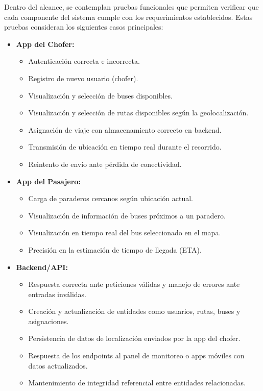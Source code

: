 \documentclass[12pt]{article}
\begin{document}
Dentro del alcance, se contemplan pruebas funcionales que permiten verificar que cada componente del sistema cumple con los requerimientos establecidos. Estas pruebas consideran los siguientes casos principales:

\begin{itemize}
    \item \textbf{App del Chofer:}
    \begin{itemize}
        \item Autenticación correcta e incorrecta.
        \item Registro de nuevo usuario (chofer).
        \item Visualización y selección de buses disponibles.
        \item Visualización y selección de rutas disponibles según la geolocalización.
        \item Asignación de viaje con almacenamiento correcto en backend.
        \item Transmisión de ubicación en tiempo real durante el recorrido.
        \item Reintento de envío ante pérdida de conectividad.
    \end{itemize}

    \item \textbf{App del Pasajero:}
    \begin{itemize}
        \item Carga de paraderos cercanos según ubicación actual.
        \item Visualización de información de buses próximos a un paradero.
        \item Visualización en tiempo real del bus seleccionado en el mapa.
        \item Precisión en la estimación de tiempo de llegada (ETA).
    \end{itemize}

    \item \textbf{Backend/API:}
    \begin{itemize}
        \item Respuesta correcta ante peticiones válidas y manejo de errores ante entradas inválidas.
        \item Creación y actualización de entidades como usuarios, rutas, buses y asignaciones.
        \item Persistencia de datos de localización enviados por la app del chofer.
        \item Respuesta de los endpoints al panel de monitoreo o apps móviles con datos actualizados.
        \item Mantenimiento de integridad referencial entre entidades relacionadas.
    \end{itemize}
\end{itemize}
\newpage
\end{document}
